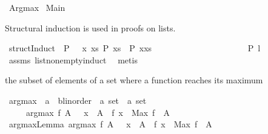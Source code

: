 %
\begin{isabellebody}%
\def\isabellecontext{Argmax}%
%
\isamarkuptrue%
%
\isadelimtheory
%
\endisadelimtheory
%
\isatagtheory
{}\isamarkupfalse%
\ Argmax\isanewline
{}\ Main\isanewline
\isanewline
{}%
\endisatagtheory
{\isafoldtheory}%
%
\isadelimtheory
%
\endisadelimtheory
%
\begin{isamarkuptext}%
Structural induction is used in proofs on lists.%
\end{isamarkuptext}%
\isamarkuptrue%
\isamarkupfalse%
\ structInduct{\isacharcolon}\ \ {\isachardoublequoteopen}P\ {\isacharbrackleft}{\isacharbrackright}{\isachardoublequoteclose}\ \ {\isachardoublequoteopen}{\isasymforall}x\ xs{\isachardot}\ P\ {\isacharparenleft}xs{\isacharparenright}\ {\isasymlongrightarrow}\ P\ {\isacharparenleft}x{\isacharhash}xs{\isacharparenright}{\isachardoublequoteclose}\ \isanewline
\ \ \ \ \ \ \ \ \ \ \ \ \ \ \ \ \ \ \ \ \ {\isachardoublequoteopen}P\ l{\isachardoublequoteclose}\ \isanewline
%
\isadelimproof
\ \ \ \ \ \ %
\endisadelimproof
%
\isatagproof
{}\isamarkupfalse%
\ assms\ list{\isacharunderscore}nonempty{\isacharunderscore}induct\ \isamarkupfalse%
\ {\isacharparenleft}metis{\isacharparenright}%
\endisatagproof
{\isafoldproof}%
%
\isadelimproof
%
\endisadelimproof
%
\begin{isamarkuptext}%
the subset of elements of a set where a function reaches its maximum%
\end{isamarkuptext}%
\isamarkuptrue%
\isamarkupfalse%
\ argmax\ {\isacharcolon}{\isacharcolon}\ {\isachardoublequoteopen}{\isacharparenleft}{\isacharprime}a\ {\isasymRightarrow}\ {\isacharprime}b{\isasymColon}linorder{\isacharparenright}\ {\isasymRightarrow}\ {\isacharprime}a\ set\ {\isasymRightarrow}\ {\isacharprime}a\ set{\isachardoublequoteclose}\isanewline
\ \ \ \ \ {\isachardoublequoteopen}argmax\ f\ A\ {\isacharequal}\ {\isacharbraceleft}\ x\ {\isasymin}\ A\ {\isachardot}\ f\ x\ {\isacharequal}\ Max\ {\isacharparenleft}f\ {\isacharbackquote}\ A{\isacharparenright}\ {\isacharbraceright}{\isachardoublequoteclose}\isanewline
\isanewline
\isanewline
{}\isamarkupfalse%
\ argmaxLemma{\isacharcolon}\ {\isachardoublequoteopen}argmax\ f\ A\ {\isacharequal}\ {\isacharbraceleft}\ x\ {\isasymin}\ A\ {\isachardot}\ f\ x\ {\isacharequal}\ Max\ {\isacharparenleft}f\ {\isacharbackquote}\ A{\isacharparenright}\ {\isacharbraceright}{\isachardoublequoteclose}\ \isanewline

\end{isabellebody}
